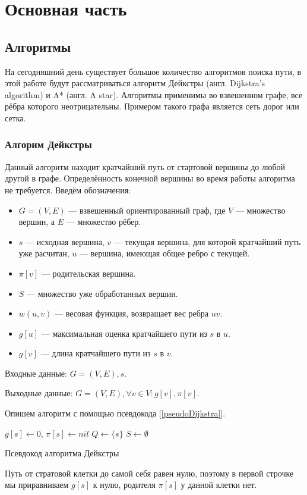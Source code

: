 \section{Основная часть}
\subsection{Алгоритмы}
На сегодняшний день существует большое количество алгоритмов поиска пути, в этой работе будут рассматриваться алгоритм Дейкстры (англ. Dijkstra’s algorithm) и A* (англ. A star). Алгоритмы применимы во взвешенном графе, все рёбра которого неотрицательны. Примером такого графа является сеть дорог или сетка. 
\subsubsection{Алгорим Дейкстры}
Данный алгоритм находит кратчайший путь от стартовой вершины до любой другой в графе. Определённость конечной вершины во время работы алгоритма не требуется.
Введём обозначения:
\begin{itemize}
    \item $G = (V,E)$ — взвешенный ориентированный граф, где $V$ — множество вершин, а $E$ — множество рёбер.
    \item $s$ — исходная вершина, $v$ — текущая вершина, для которой кратчайший путь уже расчитан, $u$ — вершина, имеющая общее ребро с текущей.
    \item $\pi[v]$ — родительская вершина.
    \item $S$ — множество уже обработанных вершин.
    \item $w(u,v)$ — весовая функция, возвращает вес ребра $uv$.
    \item $g[u]$ — максимальная оценка кратчайшего пути из $s$ в $u$.
    \item $g[v]$ — длина кратчайшего пути из $s$ в $v$.

\end{itemize}

Входные данные: $G = (V,E), s$.

Выходные данные: $G = (V,E),  \forall v \in V: g[v],\pi[v]$.

Опишем алгоритм с помощью псевдокода [\ref{pseudoDijkstra}].

\begin{algorithm}

\DontPrintSemicolon
$g[s]\gets 0$, $\pi[s] \gets nil$\;
$Q \gets \{s\}$\;
$S \gets \emptyset$\;


\caption{Псевдокод алгоритма Дейкстры}
\label{pseudoDijkstra}
\end{algorithm}
Путь от стратовой клетки до самой себя равен нулю, поэтому в первой строчке мы приравниваем $g[s]$ к нулю, родителя $\pi[s]$ у данной клетки нет.


